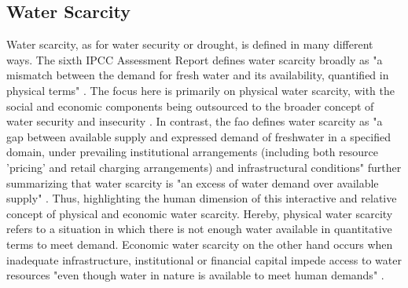 
\subsection{Water Scarcity}\label{subsec:water_scarcity}

Water scarcity, as for water security or drought, is defined in many different ways. The sixth IPCC Assessment Report defines water scarcity broadly as "a mismatch between the demand for fresh water and its availability, quantified in physical terms" \autocite[560]{caretta2022water}. The focus here is primarily on physical water scarcity, with the social and economic components being outsourced to the broader concept of water security and insecurity \autocite{caretta2022water}. In contrast, the \acrfull{fao} defines water scarcity as "a gap between available supply and expressed demand of freshwater in a specified domain, under prevailing institutional arrangements (including both resource 'pricing' and retail charging arrangements) and infrastructural conditions" \autocite[5]{faoCopingWaterScarcity2012} further summarizing that water scarcity is "an excess of water demand over available supply" \autocite[6]{faoCopingWaterScarcity2012}. Thus, highlighting the human dimension of this interactive and relative concept of physical and economic water scarcity. Hereby, physical water scarcity refers to a situation in which there is not enough water available in quantitative terms to meet demand. Economic water scarcity on the other hand occurs when inadequate infrastructure, institutional or financial capital impede access to water resources "even though water in nature is available to meet human demands" \autocites{idmpDroughtWaterScarcity2022}[11]{moldenWaterFoodWater2007}.\newline

